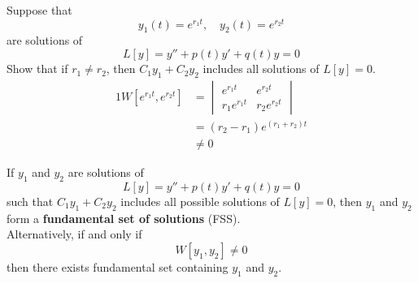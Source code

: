 \documentclass[twoside]{report}
\begin{document}
    \np
    \begin{example}
        Suppose that
        \begin{equation}
            y_{1}(t) = e^{r_{1}t},\quad y_{2}(t) = e^{r_{2}t}
        \end{equation}
        are solutions of
        \begin{equation}
            L[y] = y'' + p(t)y' + q(t)y = 0
        \end{equation}
        Show that if $r_{1} \neq r_{2}$, then $C_{1}y_{1} + C_{2}y_{2}$ includes all solutions of $L[y] = 0$.
        \begin{alignat}{1}
            W[e^{r_{1}t}, e^{r_{2}t}] &= \begin{vmatrix}
                e^{r_{1}t} & e^{r_{2}t}\\
                r_{1}e^{r_{1}t} & r_{2}e^{r_{2}t}
            \end{vmatrix}\\
            &= (r_{2} - r_{1})e^{(r_{1} + r_{2})t}\\
            &\neq 0
        \end{alignat}
    \end{example}
    \begin{definition}
        If $y_{1}$ and $y_{2}$ are solutions of
        \begin{equation}
            L[y] = y'' + p(t)y' + q(t)y = 0
        \end{equation}
        such that $C_{1}y_{1} + C_{2}y_{2}$ includes all possible solutions of $L[y] = 0$, then $y_{1}$ and $y_{2}$ form a \textbf{fundamental set of solutions} (FSS).\\
        Alternatively, if and only if
        \begin{equation}
            W[y_{1}, y_{2}] \neq 0
        \end{equation}
        then there exists fundamental set containing $y_{1}$ and $y_{2}$.
    \end{definition}
\end{document}
